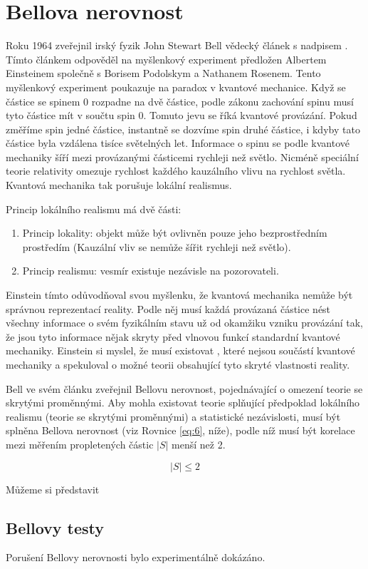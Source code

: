\section{Bellova nerovnost}
Roku 1964 zveřejnil irský fyzik John Stewart Bell vědecký článek s nadpisem . Tímto článkem odpověděl na myšlenkový experiment předložen Albertem Einsteinem společně s Borisem Podolskym a Nathanem Rosenem. Tento myšlenkový experiment poukazuje na paradox v kvantové mechanice. Když se částice se spinem 0 rozpadne na dvě částice, podle zákonu zachování spinu musí tyto částice mít v součtu spin 0. Tomuto jevu se říká kvantové provázání. Pokud změříme spin jedné částice, instantně se dozvíme spin druhé částice, i kdyby tato částice byla vzdálena tisíce světelných let. Informace o spinu se podle kvantové mechaniky šíří mezi provázanými částicemi rychleji než světlo. Nicméně speciální teorie relativity omezuje rychlost každého kauzálního vlivu na rychlost světla. Kvantová mechanika tak porušuje lokální realismus.

Princip lokálního realismu má dvě části:
    \begin{enumerate}
        \item Princip lokality: objekt může být ovlivněn pouze jeho bezprostředním prostředím (Kauzální vliv se nemůže šířit rychleji než světlo). \parencite{lokalita}
        \item Princip realismu: vesmír existuje nezávisle na pozorovateli. \parencite{realismus}
    \end{enumerate}
    
Einstein tímto odůvodňoval svou myšlenku, že kvantová mechanika nemůže být správnou reprezentací reality. Podle něj musí každá provázaná částice nést všechny informace o svém fyzikálním stavu už od okamžiku vzniku provázání tak, že jsou tyto informace nějak skryty před vlnovou funkcí standardní kvantové mechaniky. Einstein si myslel, že musí existovat , které nejsou součástí kvantové mechaniky a spekuloval o možné teorii obsahující tyto skryté vlastnosti reality.

Bell ve svém článku zveřejnil Bellovu nerovnost, pojednávající o omezení teorie se skrytými proměnnými. Aby mohla existovat teorie splňující předpoklad lokálního realismu (teorie se skrytými proměnnými) a statistické nezávislosti, musí být splněna Bellova nerovnost (viz Rovnice \ref{eq:6}, níže), podle níž musí být korelace mezi měřením propletených částic $|S|$ menší než 2.

\begin{equation}
    |S| \leq 2
    \label{eq:6}
\end{equation}

Můžeme si představit

\subsection{Bellovy testy}
Porušení Bellovy nerovnosti bylo experimentálně dokázáno. 